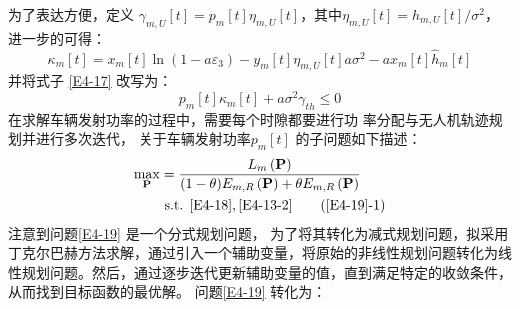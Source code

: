 为了表达方便，定义  %
$\gamma_{m,U}\left[t\right]=p_m\left[t\right]\eta_{m,U}\left[t\right]$，其中$\eta_{m,U}\left[t\right]=h_{m,U}\left[t\right]/{\sigma^2}$，进一步的可得：
\begin{equation} \label{E4-1833}
{{\kappa }_{m}}\left[ t \right]={{x}_{m}}\left[ t \right]\ln \left( 1-a{{\varepsilon }_{3}} \right)-{{y}_{m}}\left[ t \right]{{\eta }_{m,U}}\left[ t \right]a{{\sigma }^{2}}-a{{x}_{m}}\left[ t \right]{{\hat{h}}\phantom{}_{m}}\left[ t \right]
\end{equation}
 并将式子 \eqref{E4-17} 改写为：%
\begin{equation} \label{E4-18}
{{p}_{m}}\left[ t \right]{{\kappa }_{m}}\left[ t \right]+a{{\sigma }^{2}}{{\gamma }_{th}}\le 0
\end{equation}
在求解车辆发射功率的过程中，需要每个时隙都要进行功
率分配与无人机轨迹规划并进行多次迭代，
关于车辆发射功率$p_m\left[t\right]$ 的子问题如下描述：
\begin{align}  \label{E4-19}
\max _{ \mathbf{P}} &   ={\frac{{{L}_{m}}\left( \mathbf{P} \right)}
{(1-\theta){E}_{m,R}\left( \mathbf{P} \right)+\theta{E}_{m,R}\left( \mathbf{P} \right)}}        \\
&\text { s.t. }
 \eqref{E4-18},\eqref{E4-13-2}                                                  \tag{\ref{E4-19}{-1}}      \label{E4-19-1}
\end{align}
注意到问题\eqref{E4-19} 是一个分式规划问题，
为了将其转化为减式规划问题，拟采用丁克尔巴赫方法求解，通过引入一个辅助变量，将原始的非线性规划问题转化为线性规划问题。然后，通过逐步迭代更新辅助变量的值，直到满足特定的收敛条件，从而找到目标函数的最优解。
问题\eqref{E4-19} 转化为：
